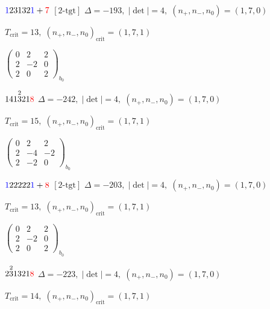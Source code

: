 \documentclass[10pt]{article}
\begin{document}
$\textcolor{blue}{1}23132\textcolor{blue}{1}+\textcolor{red}{7}$ $\scriptstyle [2\text{-tgt}]$ \quad $\Delta=-193,\; |\det|=4,\; (n_+,n_-,n_0)=(1,7,0)$

\hspace{1em}$T_{\text{crit}}=13,\; (n_+,n_-,n_0)_{\text{crit}}=(1,7,1)$

\hspace{2em}$\left(\begin{smallmatrix}0 & 2 & 2 \\ 2 & -2 & 0 \\ 2 & 0 & 2\end{smallmatrix}\right)_{\!b_0}$

\smallskip

$141\overset{2}{3}21\textcolor{red}{8}$ \quad $\Delta=-242,\; |\det|=4,\; (n_+,n_-,n_0)=(1,7,0)$

\hspace{1em}$T_{\text{crit}}=15,\; (n_+,n_-,n_0)_{\text{crit}}=(1,7,1)$

\hspace{2em}$\left(\begin{smallmatrix}0 & 2 & 2 \\ 2 & -4 & -2 \\ 2 & -2 & 0\end{smallmatrix}\right)_{\!b_0}$

\smallskip

$\textcolor{blue}{1}22222\textcolor{blue}{1}+\textcolor{red}{8}$ $\scriptstyle [2\text{-tgt}]$ \quad $\Delta=-203,\; |\det|=4,\; (n_+,n_-,n_0)=(1,7,0)$

\hspace{1em}$T_{\text{crit}}=13,\; (n_+,n_-,n_0)_{\text{crit}}=(1,7,1)$

\hspace{2em}$\left(\begin{smallmatrix}0 & 2 & 2 \\ 2 & -2 & 0 \\ 2 & 0 & 2\end{smallmatrix}\right)_{\!b_0}$

\smallskip

$2\overset{2}{3}1321\textcolor{red}{8}$ \quad $\Delta=-223,\; |\det|=4,\; (n_+,n_-,n_0)=(1,7,0)$

\hspace{1em}$T_{\text{crit}}=14,\; (n_+,n_-,n_0)_{\text{crit}}=(1,7,1)$
\end{document}
